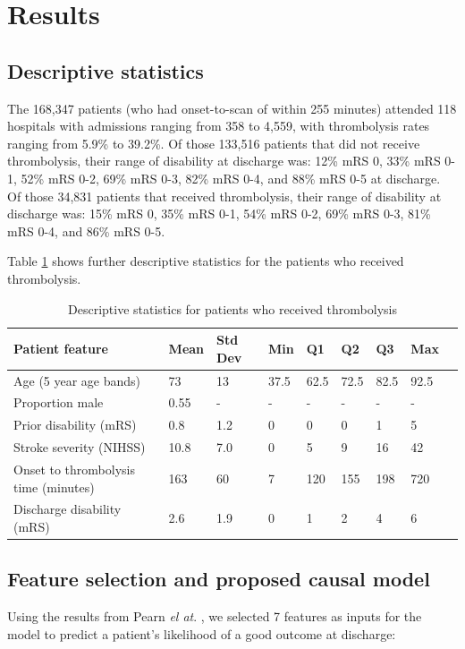 \section{Results}

\subsection{Descriptive statistics}

The 168,347 patients (who had onset-to-scan of within 255 minutes) attended 118 hospitals with admissions ranging from 358 to 4,559, with thrombolysis rates ranging from 5.9\% to 39.2\%. Of those 133,516 patients that did not receive thrombolysis, their range of disability at discharge was: 12\% mRS 0, 33\% mRS 0-1, 52\% mRS 0-2, 69\% mRS 0-3, 82\% mRS 0-4, and 88\% mRS 0-5 at discharge. Of those 34,831 patients that received thrombolysis, their range of disability at discharge was: 15\% mRS 0, 35\% mRS 0-1, 54\% mRS 0-2, 69\% mRS 0-3, 81\% mRS 0-4, and 86\% mRS 0-5.

Table \ref{tab:descriptive_stats} shows further descriptive statistics for the patients who received thrombolysis.

\begin{minipage}{1\textwidth}
\small
\renewcommand{\arraystretch}{1.2}
\begin{longtable}[]{@{}lllllllll@{}}
\caption{Descriptive statistics for patients who received thrombolysis}\label{tab:descriptive_stats}\\
\toprule
Patient feature &  Mean & Std Dev & Min & Q1 & Q2 & Q3 & Max\tabularnewline
\endhead
\midrule
Age (5 year age bands) & 73 & 13 & 37.5 & 62.5 & 72.5 & 82.5 & 92.5\tabularnewline
Proportion male & 0.55 & - & - & - & - & - & -\tabularnewline
Prior disability (mRS) & 0.8 & 1.2 & 0 & 0 & 0 & 1 & 5\tabularnewline
Stroke severity (NIHSS) & 10.8 & 7.0 & 0 & 5 & 9 & 16 & 42\tabularnewline
Onset to thrombolysis time (minutes) &  163 & 60 & 7 & 120 & 155 & 198 & 720\tabularnewline
Discharge disability (mRS) &  2.6 & 1.9 & 0 & 1 & 2 & 4 & 6\tabularnewline
\bottomrule

\end{longtable}
\normalsize
\end{minipage}

\subsection{Feature selection and proposed causal model}

Using the results from Pearn \textit{el at}. \cite{pearn_are_2024}, we selected 7 features as inputs for the model to predict a patient's likelihood of a good outcome at discharge:

